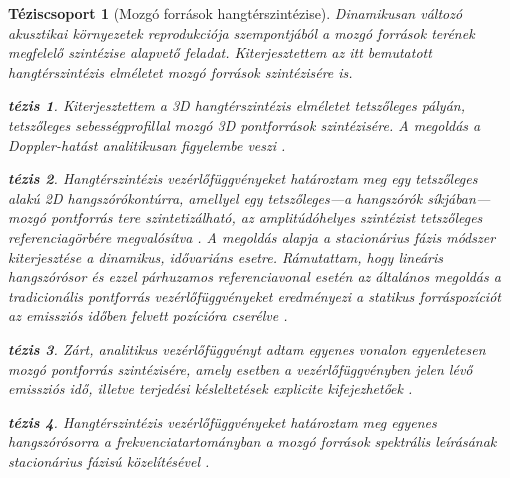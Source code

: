 \documentclass[10pt,twoside]{article}
\theoremstyle{thesisgroupstyle}
\newtheorem{thesisgroup}{Téziscsoport}
\theoremstyle{indented}
\newtheorem{thesis}{tézis}[thesisgroup]
\begin{document}
\begin{thesisgroup}[Mozgó források hangtérszintézise]
Dinamikusan változó akusztikai környezetek reprodukciója szempontjából a mozgó források terének megfelelő szintézise alapvető feladat.
Kiterjesztettem az itt bemutatott hangtérszintézis elméletet mozgó források szintézisére is.
\begin{thesis}
Kiterjesztettem a 3D hangtérszintézis elméletet tetszőleges pályán, tetszőleges sebességprofillal mozgó 3D pontforrások szintézisére.
A megoldás a Doppler-hatást analitikusan figyelembe veszi \cite{Firtha2015:daga, firtha2016wave_booklet, doi:10.1121/1.4996126_booklet}.\end{thesis}
\begin{thesis}
Hangtérszintézis vezérlőfüggvényeket határoztam meg egy tetszőleges alakú 2D hangszórókontúrra, amellyel egy tetszőleges---a hangszórók síkjában---mozgó  pontforrás tere szintetizálható, az amplitúdóhelyes szintézist tetszőleges referenciagörbére megvalósítva \cite{doi:10.1121/1.4996126_booklet}.
A megoldás alapja a stacionárius fázis módszer kiterjesztése a dinamikus, idővariáns esetre.
Rámutattam, hogy lineáris hangszórósor és ezzel párhuzamos referenciavonal esetén az általános megoldás a tradicionális pontforrás vezérlőfüggvényeket eredményezi a statikus forráspozíciót az emissziós időben felvett pozícióra cserélve \cite{doi:10.1121/1.4996126_booklet}.
\end{thesis}
\begin{thesis}
Zárt, analitikus vezérlőfüggvényt adtam egyenes vonalon egyenletesen mozgó pontforrás szintézisére, amely esetben a vezérlőfüggvényben jelen lévő emissziós idő, illetve terjedési késleltetések explicite kifejezhetőek \cite{firtha2016wave_booklet}.
\end{thesis}
\begin{thesis}
Hangtérszintézis vezérlőfüggvényeket határoztam meg egyenes hangszórósorra a frekvenciatartományban a mozgó források spektrális leírásának stacionárius fázisú közelítésével \cite{firtha2015sound_booklet}.
\end{thesis}
\end{thesisgroup}
\end{document}
